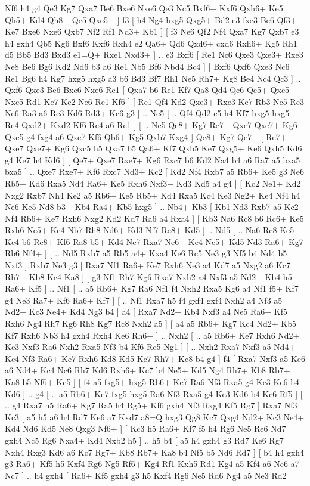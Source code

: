 Nf6  h4 g4  Qe3 Kg7  Qxa7 Be6  Bxe6 Nxe6  Qe3 Nc5  Bxf6+ Kxf6  Qxh6+ Ke5  Qh5+ Kd4  Qh8+ Qe5  Qxe5+   ]  f3 [  h4 Ng4  hxg5 Qxg5+  Bd2 e3  fxe3 Be6  Qf3+ Ke7  Bxe6 Nxe6  Qxb7 Nf2  Rf1 Nd3+  Kb1   ]  [  f3 Ne6  Qf2 Nf4  Qxa7 Kg7  Qxb7 e3  h4 gxh4  Qb5 Kg6  Bxf6 Kxf6  Rxh4 e2  Qa6+ Qd6  Qxd6+ cxd6  Rxh6+ Kg5  Rh1 d5  Bb5 Bd3  Bxd3 e1=Q+  Rxe1 Nxd3+   ] .. e3    Bxf6 [  Re1 Nc6  Qxe3 Qxe3+  Rxe3 Ne8  Be6 Bg6  Kd2 Nd6  b3 a6  Re1 Nb5  Bf6 Nbd4  Bc4   ]  [  Bxf6 Qxf6  Qxe3 Nc6  Re1 Bg6  h4 Kg7  hxg5 hxg5  a3 b6  Bd3 Bf7  Rh1 Ne5  Rh7+ Kg8  Be4 Nc4  Qc3   ] .. Qxf6    Qxe3   Be6    Bxe6   Nxe6    Re1 [  Qxa7 b6  Re1 Kf7  Qa8 Qd4  Qc6 Qc5+  Qxc5 Nxc5  Rd1 Ke7  Kc2 Ne6  Re1 Kf6   ]  [  Re1 Qf4  Kd2 Qxe3+  Rxe3 Ke7  Rb3 Nc5  Rc3 Ne6  Ra3 a6  Re3 Kd6  Rd3+ Kc6  g3   ] .. Nc5 [ .. Qf4  Qd2 c5  h4 Kf7  hxg5 hxg5  Re4 Qxd2+  Kxd2 Kf6  Rc4 a6  Rc1   ]  [ .. Nc5  Qe8+ Kg7  Re7+ Qxe7  Qxe7+ Kg6  Qxc5 g4  fxg4 a6  Qxc7 Kf6  Qb6+ Kg5  Qxb7 Kxg4   ]  Qe8+   Kg7   Qe7+ [  Re7+ Qxe7  Qxe7+ Kg6  Qxc5 h5  Qxa7 b5  Qa6+ Kf7  Qxb5 Ke7  Qxg5+ Ke6  Qxh5 Kd6  g4 Ke7  h4 Kd6   ]  [  Qe7+ Qxe7  Rxe7+ Kg6  Rxc7 b6  Kd2 Na4  b4 a6  Ra7 a5  bxa5 bxa5   ] .. Qxe7    Rxe7+   Kf6    Rxc7   Nd3+    Kc2 [  Kd2 Nf4  Rxb7 a5  Rb6+ Ke5  g3 Ne6  Rb5+ Kd6  Rxa5 Nd4  Ra6+ Ke5  Rxh6 Nxf3+  Kd3 Kd5  a4 g4   ]  [  Kc2 Ne1+  Kd2 Nxg2  Rxb7 Nh4  Ke2 a5  Rb6+ Ke5  Rb5+ Kd4  Rxa5 Kc4  Ke3 Ng2+  Ke4 Nf4  h4 Ne6  Ke5 Nd8  b3+ Kb4  Ra4+ Kb5  hxg5   ] .. Nb4+    Kb3 [  Kb1 Nd3  Rxb7 a5  Kc2 Nf4  Rb6+ Ke7  Rxh6 Nxg2  Kd2 Kd7  Ra6 a4  Rxa4   ]  [  Kb3 Na6  Rc8 b6  Rc6+ Ke5  Rxh6 Nc5+  Kc4 Nb7  Rh8 Nd6+  Kd3 Nf7  Re8+ Kd5   ] .. Nd5 [ .. Na6  Rc8 Ke5  Kc4 b6  Re8+ Kf6  Ra8 b5+  Kd4 Nc7  Rxa7 Ne6+  Ke4 Nc5+  Kd5 Nd3  Ra6+ Kg7  Rb6 Nf4+   ]  [ .. Nd5  Rxb7 a5  Rb5 a4+  Kxa4 Ke6  Rc5 Ne3  g3 Nf5  b4 Nd4  b5 Nxf3   ]  Rxb7   Ne3    g3 [  Rxa7 Nf1  Ra6+ Ke7  Rxh6 Ne3  a4 Kd7  a5 Nxg2  a6 Kc7  Rh7+ Kb8  Kc4 Ka8   ]  [  g3 Nf1  Rh7 Kg6  Rxa7 Nxh2  a4 Nxf3  a5 Nd2+  Kb4 h5  Ra6+ Kf5   ] .. Nf1 [ .. a5  Rb6+ Kg7  Ra6 Nf1  f4 Nxh2  Rxa5 Kg6  a4 Nf1  f5+ Kf7  g4 Ne3  Ra7+ Kf6  Ra6+ Kf7   ]  [ .. Nf1  Rxa7 h5  f4 gxf4  gxf4 Nxh2  a4 Nf3  a5 Nd2+  Kc3 Ne4+  Kd4 Ng3  b4   ]  a4 [  Rxa7 Nd2+  Kb4 Nxf3  a4 Ne5  Ra6+ Kf5  Rxh6 Ng4  Rh7 Kg6  Rh8 Kg7  Rc8 Nxh2  a5   ]  [  a4 a5  Rb6+ Kg7  Kc4 Nd2+  Kb5 Kf7  Rxh6 Nb3  h4 gxh4  Rxh4 Ke6  Rh6+   ] .. Nxh2 [ .. a5  Rb6+ Ke7  Rxh6 Nd2+  Kc3 Nxf3  Ra6 Nxh2  Rxa5 Nf3  b4 Kf6  Rc5 Ng1   ]  [ .. Nxh2  Rxa7 Nxf3  a5 Nd4+  Kc4 Nf3  Ra6+ Ke7  Rxh6 Kd8  Kd5 Kc7  Rh7+ Kc8  b4 g4   ]  f4 [  Rxa7 Nxf3  a5 Ke6  a6 Nd4+  Kc4 Nc6  Rh7 Kd6  Rxh6+ Kc7  b4 Ne5+  Kd5 Ng4  Rh7+ Kb8  Rb7+ Ka8  b5 Nf6+  Kc5   ]  [  f4 a5  fxg5+ hxg5  Rb6+ Ke7  Ra6 Nf3  Rxa5 g4  Kc3 Ke6  b4 Kd6   ] .. g4 [ .. a5  Rb6+ Ke7  fxg5 hxg5  Ra6 Nf3  Rxa5 g4  Kc3 Kd6  b4 Kc6  Rf5   ]  [ .. g4  Rxa7 h5  Ra6+ Kg7  Ra5 h4  Rg5+ Kf6  gxh4 Nf3  Rxg4 Kf5  Rg7   ]  Rxa7   Nf3    Kc3 [  a5 h5  a6 h4  Rd7 Ke6  a7 Kxd7  a8=Q hxg3  Qg8 Kc7  Qxg4 Nd2+  Kc3 Ne4+  Kd4 Nd6  Kd5 Ne8  Qxg3 Nf6+   ]  [  Kc3 h5  Ra6+ Kf7  f5 h4  Rg6 Ne5  Re6 Nd7  gxh4 Nc5  Rg6 Nxa4+  Kd4 Nxb2  h5   ] .. h5    b4 [  a5 h4  gxh4 g3  Rd7 Ke6  Rg7 Nxh4  Rxg3 Kd6  a6 Kc7  Rg7+ Kb8  Rb7+ Ka8  b4 Nf5  b5 Nd6  Rd7   ]  [  b4 h4  gxh4 g3  Ra6+ Kf5  h5 Kxf4  Rg6 Ng5  Rf6+ Kg4  Rf1 Kxh5  Rd1 Kg4  a5 Kf4  a6 Ne6  a7 Nc7   ] .. h4    gxh4 [  Ra6+ Kf5  gxh4 g3  h5 Kxf4  Rg6 Ne5  Rd6 Ng4  a5 Ne3  Rd2 